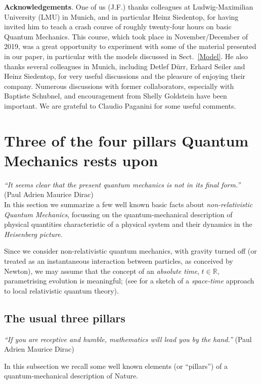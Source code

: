 \documentclass[12pt]{article}
\begin{document}
{\bf{Acknowledgements}}. One of us (J.F.) thanks colleagues at Ludwig-Maximilian University (LMU) in Munich, and
in particular {Heinz Siedentop}, for having invited him to teach a crash course of roughly twenty-four hours on
basic Quantum  Mechanics. This course, which took place in November/December of 2019, was a great opportunity
to experiment with some of the material presented in our paper, in particular with the models discussed in Sect.~\ref{Model}.
He also thanks several colleagues in Munich, including {Detlef D\"urr, Erhard Seiler} and {Heinz Siedentop},
for very useful discussions and the pleasure of enjoying their company. Numerous discussions with former collaborators, especially with {Baptiste Schubnel}, and encouragement from {Shelly Goldstein} have been important. We are grateful to {Claudio Paganini} for some useful comments.


\section{Three of the four pillars Quantum Mechanics rests upon}\label{three pillars}

\hspace{0.5cm} \textit{``It seems clear that the present quantum mechanics is not in its final form.''} (Paul Adrien Maurice Dirac)\\

In this section we summarize a few well known basic facts about \textit{non-relativistic Quantum Mechanics}, focussing on the quantum-mechanical description of physical quantities characteristic of a physical system and their
dynamics in the \textit{Heisenberg picture}.

Since we consider non-relativistic quantum mechanics, with gravity turned off (or treated as an instantaneous interaction
between particles, as conceived by Newton), we may assume that the concept of an \textit{absolute time},
$t\in \mathbb{R}$, parametrising evolution is meaningful; (see \cite{Fr2} for a sketch of a \textit{space-time}
approach to local relativistic quantum theory).

\subsection{The usual three pillars}
\hspace{0.5cm}\textit{``If you are receptive and humble, mathematics will lead you by the hand.''} (Paul Adrien Maurice Dirac)

In this subsection we recall some well known elements (or ``pillars'') of a quantum-mechanical description of Nature.\\
\end{document}
